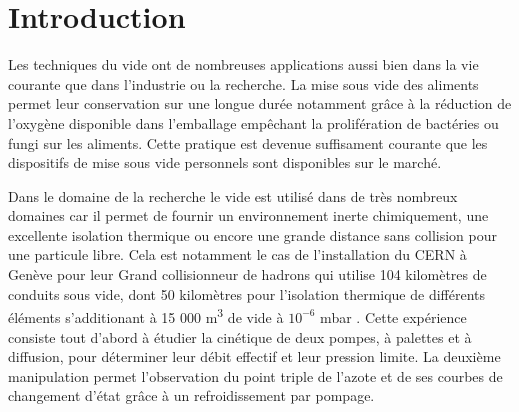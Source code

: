 \section{Introduction}

Les techniques du vide ont de nombreuses applications aussi bien dans la vie courante que dans l'industrie ou la recherche. La mise sous vide des aliments permet leur conservation sur une longue durée notamment grâce à la réduction de l'oxygène disponible dans l'emballage empêchant la prolifération de bactéries ou fungi sur les aliments. Cette pratique est devenue suffisament courante que les dispositifs de mise sous vide personnels sont disponibles sur le marché.

Dans le domaine de la recherche le vide est utilisé dans de très nombreux domaines car il permet de fournir un environnement inerte chimiquement, une excellente isolation thermique ou encore une grande distance sans collision pour une particule libre. Cela est notamment le cas de l'installation du CERN à Genève pour leur Grand collisionneur de hadrons qui utilise 104 kilomètres de conduits sous vide, dont 50 kilomètres pour l'isolation thermique de différents éléments s'additionant à 15 000 \si{\cubic \meter} de vide à \(10^{-6}\) \si{\milli \bar} \cite{CERN}.
Cette expérience consiste tout d'abord à étudier la cinétique de deux pompes, à palettes et à diffusion, pour déterminer leur débit effectif et leur pression limite. La deuxième manipulation permet l'observation du point triple de l'azote et de ses courbes de changement d'état grâce à un refroidissement par pompage.

